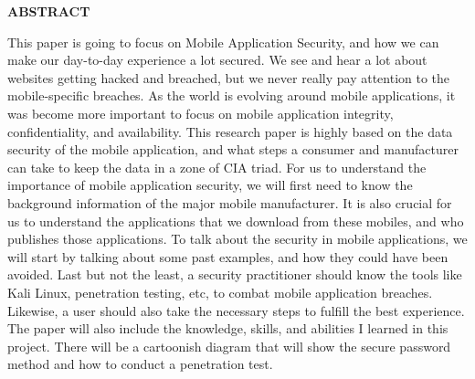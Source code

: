 \documentclass{article}
\begin{document}
\vspace{100mm}
\begin{center}
    \textbf{ABSTRACT}
\end{center}
This paper is going to focus on Mobile Application Security, and how we can make our day-to-day experience a lot secured. We see and hear a lot about websites getting hacked and breached, but we never really pay attention to the mobile-specific breaches. As the world is evolving around mobile applications, it was become more important to focus on mobile application integrity, confidentiality, and availability. This research paper is highly based on the data security of the mobile application, and what steps a consumer and manufacturer can take to keep the data in a zone of CIA triad. For us to understand the importance of mobile application security, we will first need to know the background information of the major mobile manufacturer. It is also crucial for us to understand the applications that we download from these mobiles, and who publishes those applications. To talk about the security in mobile applications, we will start by talking about some past examples, and how they could have been avoided. Last but not the least, a security practitioner should know the tools like Kali Linux, penetration testing, etc, to combat mobile application breaches. Likewise, a user should also take the necessary steps to fulfill the best experience. The paper will also include the knowledge, skills, and abilities I learned in this project. There will be a cartoonish diagram that will show the secure password method and how to conduct a penetration test.
\vspace{100mm}
\tableofcontents
\vspace{100mm}
\end{document}
